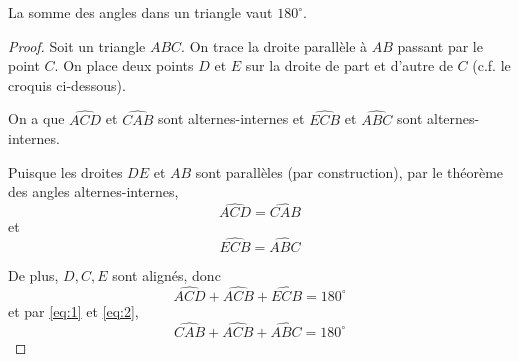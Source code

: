 \documentclass[a4paper,12pt]{report}
\begin{document}
\begin{thm}
	La somme des angles dans un triangle vaut $180^\circ$.
\end{thm}
\begin{proof}
	Soit un triangle $ABC$. On trace la droite parallèle à $AB$ passant par le point $C$. On place deux points $D$ et $E$ sur la droite de part et d'autre de $C$ (c.f. le croquis ci-dessous).

	\begin{center}
	\end{center}

On a que $\widehat{ACD}$ et $\widehat{CAB}$ sont alternes-internes et $\widehat{ECB}$ et $\widehat{ABC}$ sont alternes-internes.  

Puisque les droites $DE$ et $AB$ sont parallèles (par construction), par le théorème des angles alternes-internes, \begin{equation}\label{eq:1}\widehat{ACD}=\widehat{CAB}\end{equation} et \begin{equation}\label{eq:2}\widehat{ECB}=\widehat{ABC}\end{equation}

De plus, $D,C,E$ sont alignés, donc
\[\widehat{ACD}+\widehat{ACB}+\widehat{ECB}=180^\circ\]
et par \eqref{eq:1} et \eqref{eq:2},
\[\widehat{CAB}+\widehat{ACB}+\widehat{ABC}=180^\circ\]
\end{proof}
\end{document}
